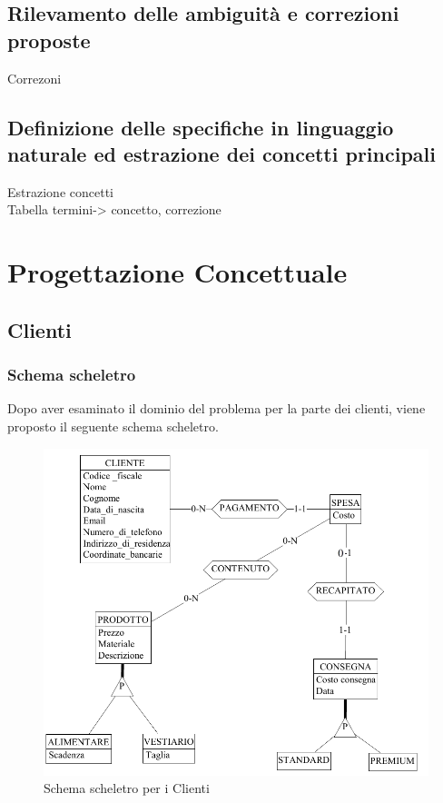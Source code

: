 \documentclass[a4paper,12pt]{report}
\begin{document}
\section{Rilevamento delle ambiguità e correzioni proposte}
Correzoni
\section{Definizione delle specifiche in linguaggio naturale ed estrazione dei concetti principali}
Estrazione concetti\\
Tabella termini-> concetto, correzione

\chapter{Progettazione Concettuale}
\section{Clienti}
\subsection{Schema scheletro}
Dopo aver esaminato il dominio del problema per la parte dei clienti, viene proposto il seguente schema scheletro.
\begin{figure}[h]
	\centering{}
	\includegraphics[width=\textwidth]{img/SchemaConcettuale-Clienti1.pdf}
	\caption{Schema scheletro per i Clienti}
\end{figure}
\end{document}
